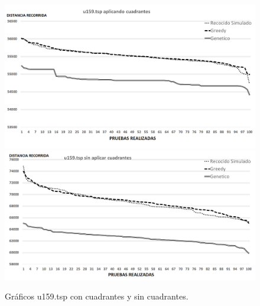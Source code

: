 \begin{figure}[hbtp]
    \centering
        \includegraphics[width=1\textwidth]{PruebasResultados/Experimentos_Graficos_Con/u159.png}
        \includegraphics[width=1\textwidth]{PruebasResultados/Experimentos_Graficos_Sin/u159.png}
        \caption{Gráficos u159.tsp con cuadrantes y sin cuadrantes.}
        \label{fig:u159_grafica.png}
\end{figure}
\newpage

